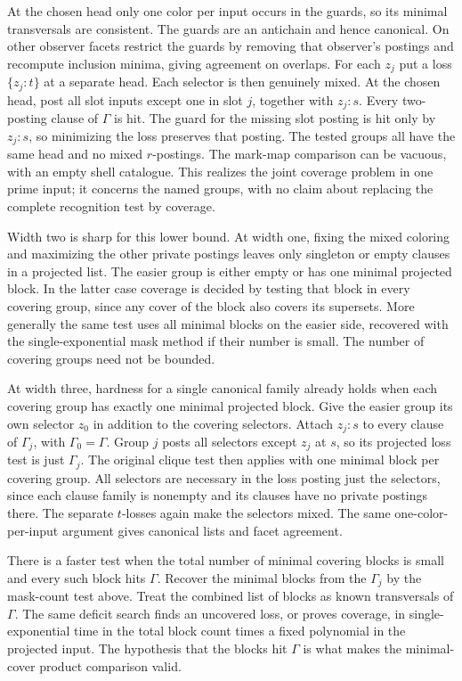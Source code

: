 At the chosen head only one color per input occurs
in the guards, so its minimal transversals are
consistent. The guards are an antichain and hence
canonical. On other observer facets restrict the
guards by removing that observer's postings and
recompute inclusion minima, giving agreement on
overlaps. For each $z_j$ put a loss $\{z_j:t\}$ at
a separate head. Each selector is then genuinely
mixed. At the chosen head, post all slot inputs
except one in slot $j$, together with $z_j:s$.
Every two-posting clause of $\Gamma$ is hit.
The guard for the missing slot posting is hit
only by $z_j:s$, so minimizing the loss preserves
that posting. The tested groups all have the same head
and no mixed $r$-postings. The mark-map comparison
can be vacuous, with an empty shell catalogue.
This realizes the joint coverage problem in one
prime input; it concerns the named groups, with
no claim about replacing the complete recognition
test by coverage.

Width two is sharp for this lower bound. At width
one, fixing the mixed coloring and maximizing the
other private postings leaves only singleton or
empty clauses in a projected list. The easier
group is either empty or has one minimal projected
block. In the latter case coverage is decided by
testing that block in every covering group, since
any cover of the block also covers its supersets.
More generally the same test uses all minimal
blocks on the easier side, recovered with the
single-exponential mask method if their number
is small. The number of covering groups need
not be bounded.

At width three, hardness for a single canonical
family already holds when each covering group has
exactly one minimal projected block. Give the easier
group its own selector $z_0$ in addition to the
covering selectors. Attach $z_j:s$ to every clause
of $\Gamma_j$, with $\Gamma_0=\Gamma$. Group $j$
posts all selectors except $z_j$ at $s$, so its
projected loss test is just $\Gamma_j$. The original
clique test then applies with one minimal block per
covering group. All selectors are necessary in the
loss posting just the selectors, since each clause
family is nonempty and its clauses have no private
postings there. The separate $t$-losses again make
the selectors mixed. The same one-color-per-input
argument gives canonical lists and facet agreement.

There is a faster test when the total number of
minimal covering blocks is small and every such
block hits $\Gamma$. Recover the minimal blocks
from the $\Gamma_j$ by the mask-count test above.
Treat the combined list of blocks as known
transversals of $\Gamma$. The same deficit search
finds an uncovered loss, or proves coverage, in
single-exponential time in the total block count
times a fixed polynomial in the projected input.
The hypothesis that the blocks hit $\Gamma$ is what
makes the minimal-cover product comparison valid.

